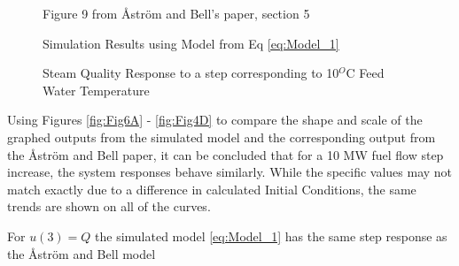        \begin{figure}[ht]
            \begin{center}
                
                Figure 9 from \r{A}str\"{o}m and Bell's paper, section 5 \cite{Astrom}
                
                
                Simulation Results using Model from Eq \eqref{eq:Model_1}
                
                \caption{Steam Quality Response to a step corresponding to 10$^O$C Feed Water Temperature}
                \label{fig:Fig9F}
            \end{center}
        \end{figure}  %
        
        \clearpage
        
        Using Figures \ref{fig:Fig6A} - \ref{fig:Fig4D} to compare the shape and scale of the graphed outputs from the simulated model and the corresponding output from the \r{A}str\"{o}m and Bell paper, it can be concluded that for a 10 MW fuel flow step increase, the system responses behave similarly. While the specific values may not match exactly due to a difference in calculated Initial Conditions, the same trends are shown on all of the curves. 
        \begin{rem}
            For $u(3) = Q$ the simulated model \eqref{eq:Model_1} has the same step response as the \r{A}str\"{o}m and Bell model
            \label{remark:u3}
        \end{rem}
        
